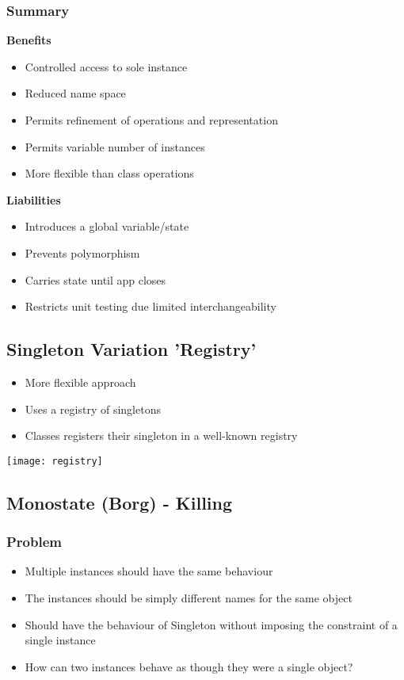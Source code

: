 \subsubsection{Summary}
\textbf{Benefits}
\begin{itemize}[topsep=0pt]
    \itemsep -0.4em
    \item Controlled access to sole instance
    \item Reduced name space
    \item Permits refinement of operations and representation
    \item Permits variable number of instances
    \item More flexible than class operations
\end{itemize}
\textbf{Liabilities}
\begin{itemize}[topsep=0pt]
    \itemsep -0.4em
    \item Introduces a global variable/state
    \item Prevents polymorphism
    \item Carries state until app closes
    \item Restricts unit testing due limited interchangeability
\end{itemize}

\subsection{Singleton Variation 'Registry'}
\begin{itemize}[topsep=0pt]
    \itemsep -0.4em
    \item More flexible approach
    \item Uses a registry of singletons
    \item Classes registers their singleton in a well-known registry
\end{itemize}
\texttt{[image: registry]}

\subsection{Monostate (Borg) - Killing}
\subsubsection{Problem}
\begin{itemize}[topsep=0pt]
    \itemsep -0.4em
    \item Multiple instances should have the same behaviour
    \item The instances should be simply different names for the same object 
    \item Should have the behaviour of Singleton without imposing the constraint of a single instance
    \item How can two instances behave as though they were a single object?
\end{itemize}
